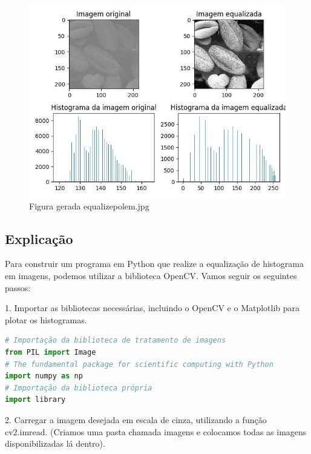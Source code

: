 \documentclass[10pt,a4paper]{article}
\begin{document}
\begin{figure}[H]
    \centering
    \includegraphics[scale=0.7]{images_generate/05/equalize_polem.jpg}
    \caption{Figura gerada equalize\textunderscore polem.jpg}
\end{figure}

\subsection{Explicação}

\begin{flushleft}
Para construir um programa em Python que realize a equalização de histograma em imagens, podemos utilizar a biblioteca OpenCV. Vamos seguir os seguintes passos:
\end{flushleft}

\begin{flushleft}    
1. Importar as bibliotecas necessárias, incluindo o OpenCV e o Matplotlib para plotar os histogramas.
\end{flushleft}

\begin{lstlisting}[language=Python]      
# Importação da biblioteca de tratamento de imagens
from PIL import Image
# The fundamental package for scientific computing with Python
import numpy as np
# Importação da biblioteca própria
import library
\end{lstlisting}

\begin{flushleft}
2. Carregar a imagem desejada em escala de cinza, utilizando a função cv2.imread. (Criamos uma pasta chamada imagens e colocamos todas as imagens disponibilizadas lá dentro).
\end{flushleft}
\end{document}
